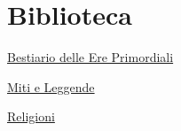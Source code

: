 \section{Biblioteca}\label{biblioteca}

\href{Bestiario\%20delle\%20Ere\%20Primordiali\%200e4108d68b484722bb5cf0e2f34c52ea.md}{Bestiario
delle Ere Primordiali}

\href{Miti\%20e\%20Leggende\%202af5ba8ec2fe4f56a745f2e9ed0284d7.md}{Miti
e Leggende}

\href{Religioni\%20a968a080f4e84aac8a91873d9028f1d1.md}{Religioni}
